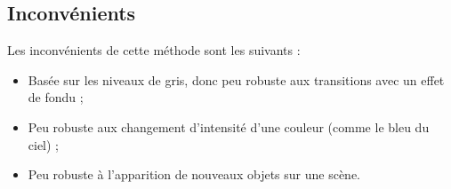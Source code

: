 \subsection{Inconvénients}

Les inconvénients de cette méthode sont les suivants :

\begin{itemize}
	\item Basée sur les niveaux de gris, donc peu robuste aux transitions avec un effet de fondu ;
	\item Peu robuste aux changement d'intensité d'une couleur (comme le bleu du ciel) ;
	\item Peu robuste à l'apparition de nouveaux objets sur une scène.
\end{itemize}
